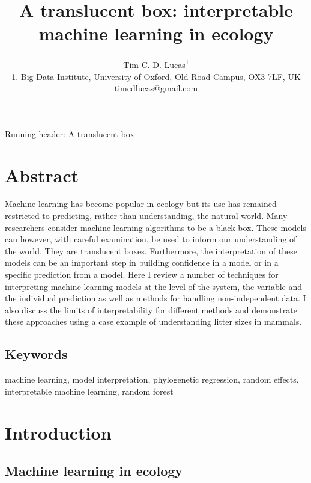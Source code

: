 \documentclass[12pt]{article}
\title{A translucent box: interpretable machine learning in ecology}
\author{Tim C. D. Lucas\textsuperscript{1}\\
1. Big Data Institute, University of Oxford, Old Road Campus, OX3 7LF, UK\\
timcdlucas@gmail.com}
\date{}
\begin{document}
\maketitle

Running header: A translucent box

\clearpage
\section{Abstract}\label{abstract}

Machine learning has become popular in ecology but its use has remained restricted to predicting, rather than understanding, the natural world.
Many researchers consider machine learning algorithms to be a black box.
These models can however, with careful examination, be used to inform our understanding of the world.
They are translucent boxes.
Furthermore, the interpretation of these models can be an important step in building confidence in a model or in a specific prediction from a model.
Here I review a number of techniques for interpreting machine learning models at the level of the system, the variable and the individual prediction as well as methods for handling non-independent data.
I also discuss the limits of interpretability for different methods and demonstrate these approaches using a case example of understanding litter sizes in mammals.

\subsection{Keywords}

machine learning, model interpretation, phylogenetic regression, random 
effects, interpretable machine learning, random forest

\section{Introduction}\label{introduction}

\subsection{Machine learning in ecology}\label{machine-learning-in-ecology}
\end{document}
